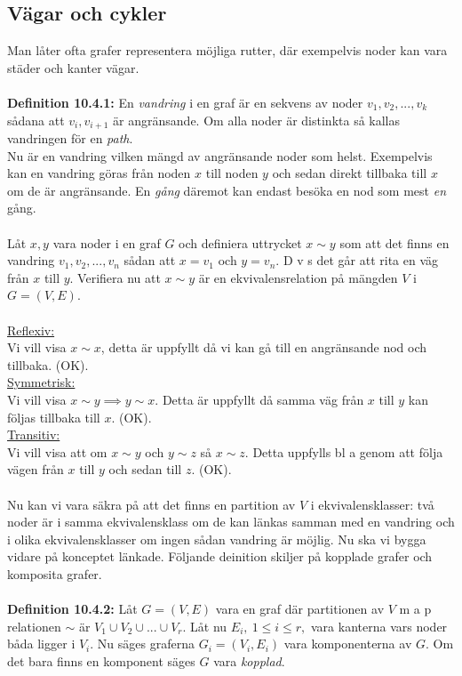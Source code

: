 \documentclass{article}
\begin{document}
\subsection{Vägar och cykler}
Man låter ofta grafer representera möjliga rutter, där exempelvis noder kan vara städer och kanter vägar.\\ \\
\textbf{Definition 10.4.1:} En \textit{vandring} i en graf är en sekvens av noder $v_1,v_2,...,v_k$ sådana att $v_i,v_{i+1}$ är angränsande. Om alla noder är distinkta så kallas vandringen för en \textit{path}.\\

Nu är en vandring vilken mängd av angränsande noder som helst. Exempelvis kan en vandring göras från noden $x$ till noden $y$ och sedan direkt tillbaka till $x$ om de är angränsande. En \textit{gång} däremot kan endast besöka en nod som mest \textit{en} gång.\\ \\ 
Låt $x,y$ vara noder i en graf $G$ och definiera uttrycket $x\sim y$ som att det finns en vandring $v_1,v_2,...,v_n$ sådan att $x=v_1$ och $y=v_n$. D v s det går att rita en väg från $x$ till $y$. Verifiera nu att $x\sim y$ är en ekvivalensrelation på mängden $V$ i $G=(V,E)$.\\ \\
\underline{Reflexiv:}\\
Vi vill visa $x\sim x$, detta är uppfyllt då vi kan gå till en angränsande nod och tillbaka. (OK).\\
\underline{Symmetrisk:}\\
Vi vill visa $x\sim y\implies y\sim x$. Detta är uppfyllt då samma väg från $x$ till $y$ kan följas tillbaka till $x$. (OK).\\
\underline{Transitiv:}\\
Vi vill visa att om $x\sim y$ och $y\sim z$ så $x\sim z$. Detta uppfylls bl a genom att följa vägen från $x$ till $y$ och sedan till $z$. (OK).\\ \\
Nu kan vi vara säkra på att det finns en partition av $V$ i ekvivalensklasser: två noder är i samma ekvivalensklass om de kan länkas samman med en vandring och i olika ekvivalensklasser om ingen sådan vandring är möjlig. Nu ska vi bygga vidare på konceptet länkade. Följande deinition skiljer på kopplade grafer och komposita grafer.\\ \\
\textbf{Definition 10.4.2:} Låt $G=(V,E)$ vara en graf där partitionen av $V$ m a p relationen $\sim$ är $V_1\cup V_2\cup...\cup V_r$. Låt nu $E_i, \ 1\leq i\leq r,$ vara kanterna vars noder båda ligger i $V_i$. Nu säges graferna $G_i=(V_i,E_i)$ vara komponenterna av $G$. Om det bara finns en komponent säges $G$ vara \textit{kopplad}.\\ \\
\end{document}
